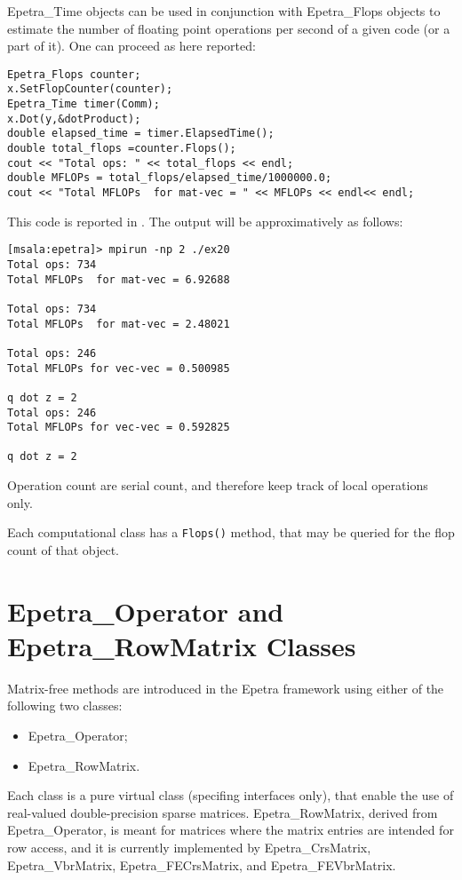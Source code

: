 Epetra\_Time objects can be used in conjunction with Epetra\_Flops
objects to estimate the number of floating point operations per second
of a given code (or a part of it). One can proceed as here reported:
\begin{verbatim}
Epetra_Flops counter;
x.SetFlopCounter(counter);
Epetra_Time timer(Comm);
x.Dot(y,&dotProduct);
double elapsed_time = timer.ElapsedTime();
double total_flops =counter.Flops();
cout << "Total ops: " << total_flops << endl;
double MFLOPs = total_flops/elapsed_time/1000000.0;
cout << "Total MFLOPs  for mat-vec = " << MFLOPs << endl<< endl;
\end{verbatim}
This code is reported in . The output will be
approximatively as follows:
\begin{verbatim}
[msala:epetra]> mpirun -np 2 ./ex20
Total ops: 734
Total MFLOPs  for mat-vec = 6.92688

Total ops: 734
Total MFLOPs  for mat-vec = 2.48021

Total ops: 246
Total MFLOPs for vec-vec = 0.500985

q dot z = 2
Total ops: 246
Total MFLOPs for vec-vec = 0.592825

q dot z = 2
\end{verbatim}

\begin{remark} Operation count are serial count, and therefore keep
  track of local operations only.
\end{remark}

\begin{remark}
  Each computational class has a \verb!Flops()! method, that may be
  queried for the flop count of that object.
\end{remark}



\section{Epetra\_Operator and Epetra\_RowMatrix Classes}
\label{sec:operator}

Matrix-free methods are introduced in the Epetra framework using either
of the following two classes:
\begin{itemize}
\item Epetra\_Operator;
\item Epetra\_RowMatrix.
\end{itemize}
Each class is a pure virtual class (specifing interfaces only), that
enable the use of real-valued double-precision sparse matrices.
Epetra\_RowMatrix, derived from Epetra\_Operator, is meant for matrices
where the matrix entries are intended for row access, and it is
currently implemented by Epetra\_CrsMatrix, Epetra\_VbrMatrix,
Epetra\_FECrsMatrix, and Epetra\_FEVbrMatrix.

